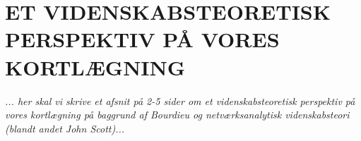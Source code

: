 

\section{ET VIDENSKABSTEORETISK PERSPEKTIV PÅ VORES KORTLÆGNING \label{videnskabsteori}}

\emph{... her skal vi skrive et afsnit på 2-5 sider om et videnskabsteoretisk perspektiv på vores kortlægning på baggrund af Bourdieu og netværksanalytisk videnskabsteori (blandt andet John Scott)...} %












